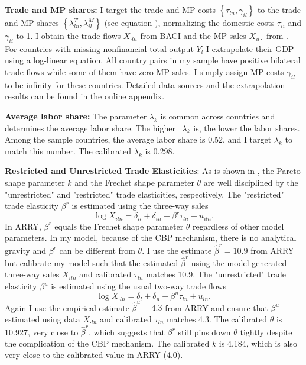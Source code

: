 \documentclass[notitlepage,11pt]{article}%
\begin{document}
\textbf{Trade and MP shares: }I target the trade and MP costs $\left\{
\tau_{ln},\gamma_{il}\right\}  $ to the trade and MP shares $\left\{
\lambda_{ln}^{T},\lambda_{il}^{M}\right\}  $ (see equation ), normalizing the
domestic costs $\tau_{ii}$ and $\gamma_{ii}$ to 1. I obtain the trade flows
$X_{\cdot ln}$ from BACI and the MP sales $X_{il\cdot}$ from
\cite{ramondo_multinational_2015}. For countries with missing nonfinancial
total output $Y_{l}$ I extrapolate their GDP using a log-linear equation. All
country pairs in my sample have positive bilateral trade flows while some of
them have zero MP sales. I simply assign MP costs $\gamma_{il}$ to be infinity
for these countries. Detailed data sources and the extrapolation results can
be found in the online appendix.

\textbf{Average labor share: }The parameter $\lambda_{k}$ is common across
countries and determines the average labor share. The higher \ $\lambda_{k}$
is, the lower the labor shares. Among the sample countries, the average labor
share is 0.52, and I target $\lambda_{k}$ to match this number. The calibrated
$\lambda_{k}$ is 0.298.

\textbf{Restricted and Unrestricted Trade Elasticities}: As is shown in
\cite{arkolakis_innovation_2013}, the Pareto shape parameter $k$ and the
Frechet shape parameter $\theta$ are well disciplined by the "unrestricted"
and "restricted" trade elasticities, respectively. The "restricted" trade
elasticity $\beta^{r}$ is estimated using the three-way sales%
\[
\log X_{iln}=\delta_{il}+\delta_{in}-\beta^{r}\tau_{ln}+u_{iln}.
\]
In ARRY, $\beta^{r}$ equals the Frechet shape parameter $\theta$ regardless of
other model parameters. In my model, because of the CBP mechanism, there is no
analytical gravity and $\beta^{r}$ can be different from $\theta$. I use the
estimate $\hat{\beta}^{r}=10.9$ from ARRY but calibrate my model such that the
estimated $\hat{\beta}^{r}$ using the model generated three-way sales
$X_{iln}$ and calibrated $\tau_{ln}$ matches 10.9. The "unrestricted" trade
elasticity $\beta^{u}$ is estimated using the usual two-way trade flows%
\[
\log X_{\cdot ln}=\delta_{l}+\delta_{n}-\beta^{u}\tau_{ln}+u_{ln}.
\]
Again I use the empirical estimate $\hat{\beta}^{u}=4.3$ from ARRY and ensure
that $\beta^{u}$ estimated using data $X_{\cdot ln}$ and calibrated $\tau
_{ln}$ matches 4.3. The calibrated $\theta$ is 10.927, very close to
$\hat{\beta}^{r}$, which suggests that $\beta^{r}$ still pins down $\theta$
tightly despite the complication of the CBP mechanism. The calibrated $k$ is
4.184, which is also very close to the calibrated value in ARRY (4.0).
\end{document}
